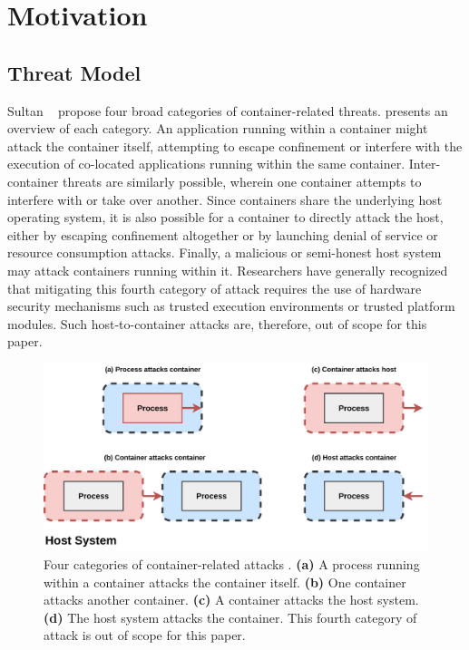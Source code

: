 \section{Motivation}
\label{sec:motivation}

\subsection{Threat Model}%
\label{sub:threat_model}

Sultan \etal~\cite{sultan2019_container_security} propose four broad categories of container-related threats.  presents an overview of each category. An application running within a container might attack the container itself, attempting to escape confinement or interfere with the execution of co-located applications running within the same container. Inter-container threats are similarly possible, wherein one container attempts to interfere with or take over another. Since containers share the underlying host operating system, it is also possible for a container to directly attack the host, either by escaping confinement altogether or by launching denial of service or resource consumption attacks. Finally, a malicious or semi-honest host system may attack containers running within it. Researchers have generally recognized that mitigating this fourth category of attack requires the use of hardware security mechanisms \cite{sultan2019_container_security,xin2018_container_security,chen2019_container_dos} such as trusted execution environments or trusted platform modules. Such host-to-container attacks are, therefore, out of scope for this paper.

\begin{figure}[htpb]
  \centering
  \includegraphics[width=0.8\linewidth]{figs/threat-model.pdf}
  \caption{
    Four categories of container-related attacks \cite{sultan2019_container_security}. \textbf{(a)} A process running within a container attacks the container itself. \textbf{(b)} One container attacks another container. \textbf{(c)} A container attacks the host system. \textbf{(d)} The host system attacks the container. This fourth category of attack is out of scope for this paper.
  }%
  \label{fig:threat_model}
\end{figure}

